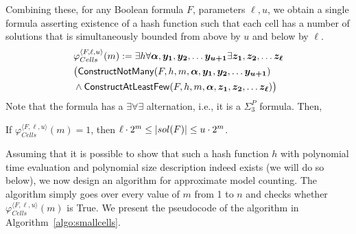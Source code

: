 Combining these, for any Boolean formula $F$, parameters $\ell, u$, we obtain a single formula asserting existence of a hash function such that each cell has a number of solutions that is simultaneously bounded from above by $u$ and below by $\ell$.
\begin{align*}
 & \varphi^{\langle F, \ell, u \rangle}_{Cells}(m):=\exists h \forall \vecbold{\alpha}, \vecbold{y_1}, \vecbold{y_2}, \ldots \vecbold{y_{u+1}} \exists \vecbold{z_1}, \vecbold{z_2}, \ldots \vecbold{z_{\ell}} \\ 
  &\big( \mathsf{ConstructNotMany}(F,h, m, \vecbold{\alpha}, \vecbold{y_1}, \vecbold{y_2}, \ldots \vecbold{y_{u+1}})\nonumber  \\
  & \wedge \mathsf{ConstructAtLeastFew}(F, h, m, \vecbold{\alpha}, \vecbold{z_1}, \vecbold{z_2}, \ldots \vecbold{z_{\ell}})\big)

\end{align*}
Note that 
the formula has a $\exists\forall\exists$ alternation, i.e., it is a $\Sigma_3^P$ formula. Then,
\begin{proposition}
\label{prop:bgp}

If $\varphi^{\langle F,\ell,u\rangle}_{Cells}(m)=1$, then $\ell\cdot 2^m \leq |sol({F})|\leq u\cdot 2^m$.
\end{proposition}
Assuming that it is possible to show that such a hash function $h$ with polynomial time evaluation and polynomial size description indeed exists (we will do so below), we now design an algorithm for approximate model counting. The algorithm simply goes over every value of $m$ from 1 to $n$ and checks whether  $ \varphi^{\langle F, \ell, u\rangle}_{Cells}(m)$ is True. We present the pseudocode of the algorithm in Algorithm~\ref{algo:smallcells}. 

